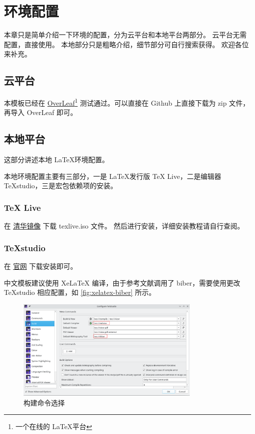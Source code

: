 \chapter{环境配置}

本章只是简单介绍一下环境的配置，分为云平台和本地平台两部分。
云平台无需配置，直接使用。
本地部分只是粗略介绍，细节部分可自行搜索获得。
欢迎各位来补充。

\section{云平台}

本模板已经在 \href{https://www.overleaf.com}{OverLeaf}\footnote{一个在线的 \LaTeX 平台} 测试通过。可以直接在 Github 上直接下载为 zip 文件，再导入 OverLeaf 即可。

\section{本地平台}

这部分讲述本地 \LaTeX 环境配置。

本地环境配置主要有三部分，一是 \LaTeX 发行版 TeX Live，二是编辑器 TeXstudio，三是宏包依赖项的安装。

\subsection{TeX Live}

在 \href{https://mirrors.tuna.tsinghua.edu.cn/CTAN/systems/texlive/Images/}{清华镜像} 下载 texlive.iso 文件。
然后进行安装，详细安装教程请自行查阅。

\subsection{TeXstudio}

在 \href{http://texstudio.sourceforge.net/}{官网} 下载安装即可。

中文模板建议使用 XeLaTeX 编译，由于参考文献调用了 biber，需要使用更改 TeXstudio 相应配置，如 \autoref{fig:xelatex-biber} 所示。

\begin{figure}[htbp]
    \centering
    \includegraphics[width=0.8\textwidth]{img/xelatex-biber.png}
    \caption{构建命令选择}
    \label{fig:xelatex-biber}
\end{figure}

